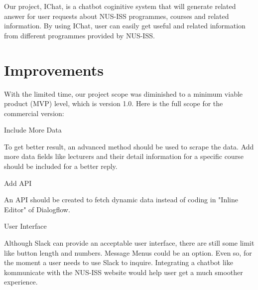 
Our project, IChat, is a chatbot coginitive system that will generate related answer for user requests about NUS-ISS programmes, courses and related information.
By using IChat, user can easily get useful and related information from different programmes provided by NUS-ISS.


\section{Improvements} %
\label{sub:improvements}

With the limited time, our project scope was diminished to a minimum viable product (MVP) level, which is version 1.0. Here is the full scope for the commercial version:

\begin{description}[align=left]
	\item [version 1.1] Include More Data

		To get better result, an advanced method should be used to scrape the data. Add more data fields like lecturers and their detail information for a specific course should be included for a better reply.

	\item [version 1.2] Add API

		An API should be created to fetch dynamic data instead of coding in "Inline Editor" of Dialogflow.

	\item [version 1.3] User Interface

		Although Slack can provide an acceptable user interface, there are still some limit like button length and numbers. Message Menus \cite{messagemenu} could be an option. Even so, for the moment a user needs to use Slack to inquire. Integrating a chatbot like kommunicate \cite{kommunicate}with the NUS-ISS website would help user get a much smoother experience.



\end{description}


